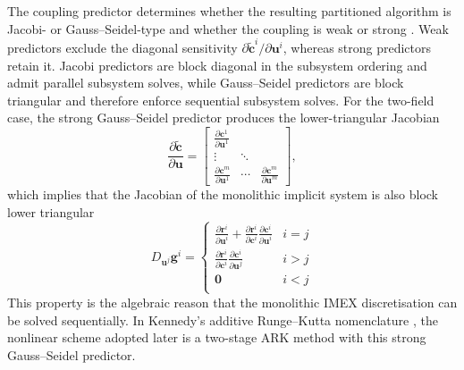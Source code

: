 The coupling predictor determines whether the resulting partitioned algorithm is Jacobi- or Gauss--Seidel-type and whether the coupling is weak or strong \cite{Huang_2019}. Weak predictors exclude the diagonal sensitivity $\partial \tilde{\mathbf{c}}^i / \partial \mathbf{u}^i$, whereas strong predictors retain it. Jacobi predictors are block diagonal in the subsystem ordering and admit parallel subsystem solves, while Gauss--Seidel predictors are block triangular and therefore enforce sequential subsystem solves. For the two-field case, the strong Gauss--Seidel predictor produces the lower-triangular Jacobian
%
\begin{equation*}
    \frac{\partial \tilde{\mathbf{c}}}{\partial \mathbf{u}} =
    \begin{bmatrix}
        \frac{\partial \mathbf{c}^1}{\partial \mathbf{u}^1} &        &                                                     \\
        \vdots                                              & \ddots &                                                     \\
        \frac{\partial \mathbf{c}^m}{\partial \mathbf{u}^1} & \cdots & \frac{\partial \mathbf{c}^m}{\partial \mathbf{u}^m}
    \end{bmatrix},
\end{equation*}
%
which implies that the Jacobian of the monolithic implicit system is also block lower triangular
%
\begin{equation*}
    D_{\mathbf{u}^j} \mathbf{g}^i =
    \left\{
    \begin{array}{ll}
        \frac{\partial \mathbf{r}^i}{\partial \mathbf{u}^i} + \frac{\partial \mathbf{r}^i}{\partial \mathbf{c}^i}\frac{\partial \mathbf{c}^i}{\partial \mathbf{u}^i} & i=j \\
        \frac{\partial \mathbf{r}^i}{\partial \mathbf{c}^i}\frac{\partial \mathbf{c}^i}{\partial \mathbf{u}^j}                                                       & i>j \\
        \mathbf{0}                                                                                                                                                   & i<j \\
    \end{array}
    \right.
\end{equation*}
%
This property is the algebraic reason that the monolithic IMEX discretisation can be solved sequentially.
In Kennedy's additive Runge--Kutta nomenclature \cite{Kennedy_2003},
the nonlinear scheme adopted later is a two-stage ARK method with this strong Gauss--Seidel predictor.

